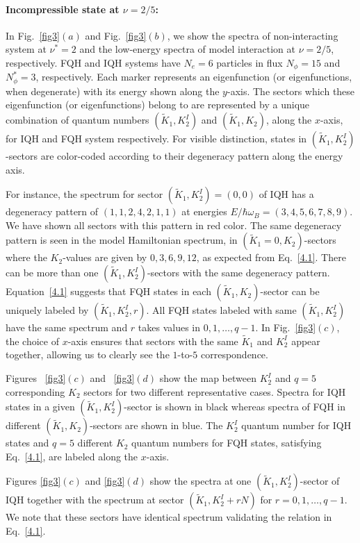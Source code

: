 \documentclass[prb,aps,epsfig,longbibliography,twocolumn]{revtex4-1}
\newcommand{\np}{N_{\phi}}
\begin{document}
\paragraph{Incompressible state at $\nu=2/5$:} In Fig.~\ref{fig3}$(a)$ and  Fig.~\ref{fig3}$(b)$, we show the spectra of non-interacting system at $\nu^{*}=2$ and the low-energy spectra of model interaction at $\nu=2/5$, respectively. FQH and IQH systems have $N_e=6$ particles in flux $\np=15$ and $\np^*=3$, respectively. Each marker represents an eigenfunction (or eigenfunctions, when degenerate) with its energy shown along the $y$-axis. The sectors which these eigenfunction (or eigenfunctions) belong to are represented by a unique combination of quantum numbers $(\tilde{K}_1,K^I_2)$ and $(\tilde{K}_1,K_2)$, along the $x$-axis, for IQH and FQH system respectively. For visible distinction, states in $(\tilde{K}_1,K^I_2)$-sectors are color-coded according to their degeneracy pattern along the energy axis. 

For instance, the spectrum for sector $(\tilde{K}_1,K^I_2)=(0,0)$ of IQH has a degeneracy pattern of $(1,1,2,4,2,1,1)$ at energies $E/\hbar\omega_B=(3,4,5,6,7,8,9)$. We have shown all sectors with this pattern in red color.  The same degeneracy pattern is seen in the model Hamiltonian spectrum, in $(\tilde{K}_1=0,K_2)$-sectors where the $K_2$-values are given by $0,3,6,9,12$, as expected from Eq.~\eqref{4.1}. There can be more than one $(\tilde{K}_1,K^I_2)$-sectors with the same degeneracy pattern. Equation~\eqref{4.1} suggests that FQH states in each $(\tilde{K}_1,K_2)$-sector can be uniquely labeled by $(\tilde{K}_1,K^I_2,r)$. All FQH states labeled with same $(\tilde{K}_1,K^I_2)$ have the same spectrum and $r$ takes values in $0,1,\dots,q-1$. In Fig.~\ref{fig3}$(c)$, the choice of $x$-axis ensures that sectors with the same $\tilde{K}_1$ and $K^I_2$ appear together, allowing us to clearly see the $1$-to-$5$ correspondence.




Figures ~\ref{fig3}$(c)$ and ~\ref{fig3}$(d)$ show the map between  $K^I_2$ and $q=5$ corresponding $K_2$ sectors for two different representative cases. Spectra for IQH states in a given  $(\tilde{K}_1,K^I_2)$-sector is shown in black whereas spectra of  FQH in different  $(\tilde{K}_1,K_2)$-sectors are shown in blue. The $K^I_2$ quantum number for IQH states and $q=5$ different $K_2$ quantum numbers for FQH states, satisfying Eq.~\ref{4.1}, are labeled along the $x$-axis.

Figures \ref{fig3}$(c)$ and \ref{fig3}$(d)$ show the spectra at one $(\tilde{K}_1,K_2^{I})$-sector of IQH together with the spectrum at sector $(\tilde{K}_1,K_2^{I} + rN)$ for $r=0,1,\dots,q-1$. We note that these sectors have identical spectrum validating the relation in Eq.~\eqref{4.1}. 
\end{document}
